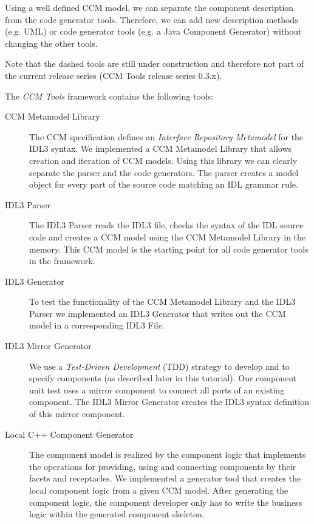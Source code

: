 Using a well defined CCM model, we can separate the component description from
the code generator tools. Therefore, we can add new description methods (e.g.
UML) or code generator tools (e.g. a Java Component Generator) without changing
the other tools.

Note that the dashed tools are still under construction and therefore not part
of the current release series (CCM Tools release series 0.3.x).

\newpage
\noindent
The {\it CCM Tools} framework contains the following tools:

\begin{description}
\item [CCM Metamodel Library]
The CCM specification defines an {\it Interface Repository Metamodel} for the
IDL3 syntax. We implemented a CCM Metamodel Library that allows creation and
iteration of CCM models. Using this library we can clearly separate the parser
and the code generators. The parser creates a model object for every part of the
source code matching an IDL grammar rule.

\item [IDL3 Parser]
The IDL3 Parser reads the IDL3 file, checks the syntax of the IDL source code
and creates a CCM model using the CCM Metamodel Library in the memory. This CCM
model is the starting point for all code generator tools in the framework.

\item [IDL3 Generator]
To test the functionality of the CCM Metamodel Library and the IDL3 Parser we implemented
an IDL3 Generator that writes out the CCM model in a corresponding IDL3 File.

\item [IDL3 Mirror Generator]
We use a {\it Test-Driven Development} (TDD) strategy to develop and to specify
components (as described later in this tutorial). Our component unit test uses a
mirror component to connect all ports of an existing component. The IDL3 Mirror
Generator creates the IDL3 syntax definition of this mirror component.

\item [Local C++ Component Generator]
The component model is realized by the component logic that implements the
operations for providing, using and connecting components by their facets and
receptacles. We implemented a generator tool that creates the local component
logic from a given CCM model. After generating the component logic, the
component developer only has to write the business logic within the generated
component skeleton.


\end{description}
